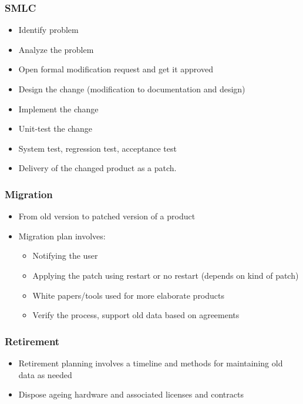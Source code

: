 \documentclass{article}
\begin{document}
\subsubsection{SMLC}
\begin{itemize}
    \item Identify problem
    
    \item Analyze the problem
    
    \item Open formal modification request and get it approved
    
    \item Design the change (modification to documentation and design)
    
    \item Implement the change
    
    \item Unit-test the change
    
    \item System test, regression test, acceptance test
    
    \item Delivery of the changed product as a patch. 
\end{itemize}

\subsubsection{Migration}
\begin{itemize}
    \item From old version to patched version of a product
    
    \item Migration plan involves:
    \begin{itemize}
        \item Notifying the user
        
        \item Applying the patch using restart or no restart (depends on kind of patch)
        
        \item White papers/tools used for more elaborate products
        
        \item Verify the process, support old data based on agreements
    \end{itemize}
\end{itemize}

\subsubsection{Retirement}
\begin{itemize}
    \item Retirement planning involves a timeline and methods for maintaining old data as needed
    
    \item Dispose ageing hardware and associated licenses and contracts
\end{itemize}
\end{document}
